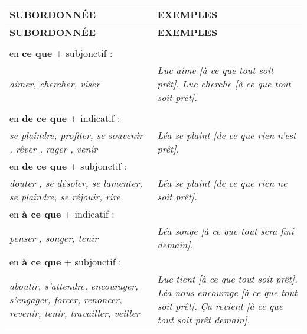 \documentclass[UTF8]{report}
\begin{document}
\begin{table}[H]
    \centering
    \begin{longtable}{|m{7cm}|m{8cm}|}
    \hline
    \rowcolor{cyan!20}
    \textbf{SUBORDONNÉE} & \textbf{EXEMPLES} \\
    \hline
    \endfirsthead
    \hline
    \rowcolor{cyan!20}
    \textbf{SUBORDONNÉE} & \textbf{EXEMPLES} \\
    \hline
    \endhead
    \hline
    \endfoot
    \hline
    \endlastfoot
    \rowcolor{cyan!20}
    \multicolumn{2}{|c|}{\textbf{COMPLÉMENT DIRECT}} \\ 
    \hline
    en \textbf{ce que} + subjonctif : & \\
    \textit{aimer, chercher, viser} & \textit{Luc aime [\`{a} ce que tout soit pr\^{e}t].} \newline \textit{Luc cherche [\`{a} ce que tout soit pr\^{e}t].} \\
    \hline
    \rowcolor{cyan!20}
    \multicolumn{2}{|c|}{\textbf{COMPLÉMENT OBLIQUE}} \\ 
    \hline
    en \textbf{de ce que} + indicatif : & \\
    \textit{se plaindre, profiter, se souvenir , r\^{e}ver , rager , venir} & \textit{L\'{e}a se plaint [de ce que rien n'est pr\^{e}t].} \\
    \hline
    en \textbf{de ce que} + subjonctif : & \\
    \textit{douter , se d\^{e}soler, se lamenter, se plaindre, se r\'{e}jouir, rire} & \textit{L\'{e}a se plaint [de ce que rien ne soit pr\^{e}t].} \\
    \hline
    en \textbf{\`{a} ce que} + indicatif : & \\
    \textit{penser , songer, tenir} & \textit{L\'{e}a songe [\`{a} ce que tout sera fini demain].} \\
    \hline
    en \textbf{\`{a} ce que} + subjonctif : & \\
    \textit{aboutir, s'attendre, encourager, s'engager, forcer, renoncer, revenir, tenir, travailler, veiller} & \textit{Luc tient [\`{a} ce que tout soit pr\^{e}t].} \newline \textit{L\'{e}a nous encourage [\`{a} ce que tout soit pr\^{e}t].} \newline \textit{\c{C}a revient [\`{a} ce que tout soit pr\^{e}t demain].} \\
    \hline
    \end{longtable}
\end{table}
\end{document}
